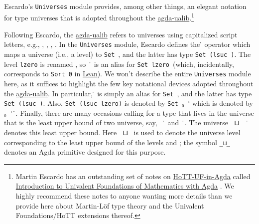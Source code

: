\documentclass[sigplan,screen]{acmart}
\newcommand\ab[1]{\AgdaBound{#1}}
\newcommand{\agdaualib}{\href{https://ualib.org}{agda-ualib}\xspace}
\newcommand{\agdaualib}{\href{anonymizedLink/agda-ualib.html}{agda-ualib}\xspace}
\begin{document}
\begin{code}
\\[\AgdaEmptyExtraSkip]%
\>[0]\AgdaSpace{}%
\AgdaSpace{}%
\<%
\\
%
\\[\AgdaEmptyExtraSkip]%
\>[0]\AgdaSpace{}%
\AgdaSpace{}%
\AgdaSpace{}%
\<%
\end{code}
Escardo's \texttt{Universes} module provides, among other things, an elegant notation for type universes that is adopted throughout the \agdaualib.\footnote{Martin Escardo has an outstanding set of notes on \href{https://www.cs.bham.ac.uk/~mhe/HoTT-UF-in-Agda-Lecture-Notes/HoTT-UF-Agda.html}{HoTT-UF-in-Agda} called \href{https://www.cs.bham.ac.uk/~mhe/HoTT-UF-in-Agda-Lecture-Notes/index.html}{Introduction to Univalent Foundations of Mathematics with Agda} . We highly recommend these notes to anyone wanting more details than we provide here about Martin-Löf type theory and the Univalent Foundations/HoTT extensions thereof.}

Following Escardo, the \agdaualib refers to universes using capitalized script letters, e.g., \ab 𝓤, \ab 𝓥, \ab 𝓦, \ab 𝓣. In the \texttt{Universes} module, Escardo defines the ̇ operator which maps a universe \ab 𝓤 (i.e., a level) to \texttt{Set}\ \ab 𝓤, and the latter has type \texttt{Set (lsuc}\ \ab 𝓤\texttt{)}.  The level \texttt{lzero} is renamed \ab{𝓤₀}, so \ab{𝓤₀}\ ̇ is an alias for \texttt{Set\ lzero}\ (which, incidentally, corresponds to \texttt{Sort\ 0} in \href{https://leanprover.github.io/}{Lean}). We won't describe the entire \texttt{Universes} module here, as it suffices to highlight the few key notational devices adopted throughout the \agdaualib.  In particular, \ab 𝓤 ̇ is simply an alias for \texttt{Set}\ \ab 𝓤, and the latter has type \texttt{Set\ (lsuc}\ \ab 𝓤\texttt{)}. Also, \texttt{Set\ (lsuc\ lzero)} is denoted by \texttt{Set}\ \ab 𝓤₀\ ⁺ which is denoted by \ab 𝓤₀\ ⁺\ ̇.
Finally, there are many occasions calling for a type that lives in the universe that is the least upper bound of two universe, say, \ab 𝓤~ ̇ and \ab 𝓥\ ̇. The universe \ab 𝓤~⊔~\ab 𝓥~ ̇ denotes this least upper bound. Here \ab 𝓤~⊔~\ab 𝓥 is used to denote the universe level corresponding to the least upper bound of the levels \ab 𝓤 and \ab 𝓥; the symbol \texttt{\_⊔\_} denotes an Agda primitive designed for this purpose.
\end{document}
